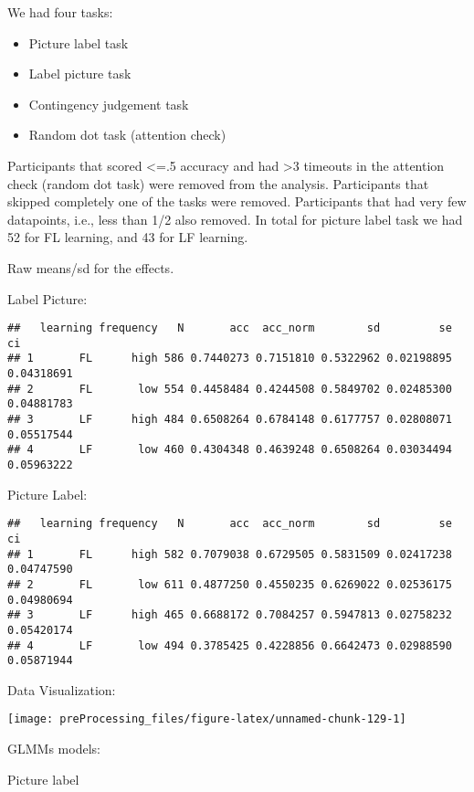 \documentclass[
]{article}
\begin{document}
We had four tasks:

\begin{itemize}
\item
  Picture label task
\item
  Label picture task
\item
  Contingency judgement task
\item
  Random dot task (attention check)
\end{itemize}

Participants that scored \textless=.5 accuracy and had \textgreater3
timeouts in the attention check (random dot task) were removed from the
analysis. Participants that skipped completely one of the tasks were
removed. Participants that had very few datapoints, i.e., less than 1/2
also removed. In total for picture label task we had 52 for FL learning,
and 43 for LF learning.

Raw means/sd for the effects.

Label Picture:

\begin{verbatim}
##   learning frequency   N       acc  acc_norm        sd         se         ci
## 1       FL      high 586 0.7440273 0.7151810 0.5322962 0.02198895 0.04318691
## 2       FL       low 554 0.4458484 0.4244508 0.5849702 0.02485300 0.04881783
## 3       LF      high 484 0.6508264 0.6784148 0.6177757 0.02808071 0.05517544
## 4       LF       low 460 0.4304348 0.4639248 0.6508264 0.03034494 0.05963222
\end{verbatim}

Picture Label:

\begin{verbatim}
##   learning frequency   N       acc  acc_norm        sd         se         ci
## 1       FL      high 582 0.7079038 0.6729505 0.5831509 0.02417238 0.04747590
## 2       FL       low 611 0.4877250 0.4550235 0.6269022 0.02536175 0.04980694
## 3       LF      high 465 0.6688172 0.7084257 0.5947813 0.02758232 0.05420174
## 4       LF       low 494 0.3785425 0.4228856 0.6642473 0.02988590 0.05871944
\end{verbatim}

Data Visualization:

\begin{center}\texttt{[image: preProcessing\_files/figure-latex/unnamed-chunk-129-1]} \end{center}

GLMMs models:

Picture label
\end{document}
